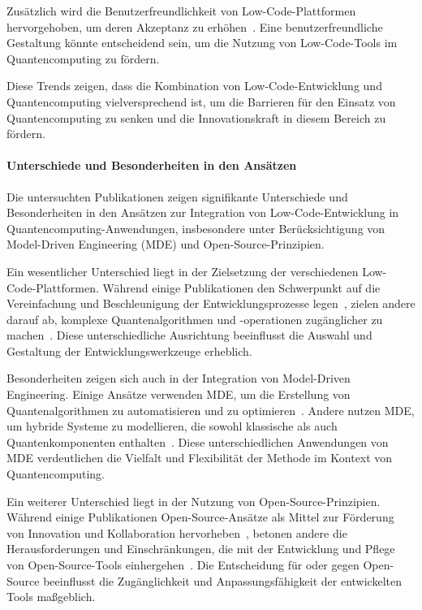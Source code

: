 Zusätzlich wird die Benutzerfreundlichkeit von Low-Code-Plattformen hervorgehoben, um deren Akzeptanz zu erhöhen~\cite{Pinho_2022, Prinz_2021}. 
Eine benutzerfreundliche Gestaltung könnte entscheidend sein, um die Nutzung von Low-Code-Tools im Quantencomputing zu fördern.

Diese Trends zeigen, dass die Kombination von Low-Code-Entwicklung und Quantencomputing vielversprechend ist, um die 
Barrieren für den Einsatz von Quantencomputing zu senken und die Innovationskraft in diesem Bereich zu fördern.

\paragraph{Unterschiede und Besonderheiten in den Ansätzen}

Die untersuchten Publikationen zeigen signifikante Unterschiede und Besonderheiten in den Ansätzen 
zur Integration von Low-Code-Entwicklung in Quantencomputing-Anwendungen, insbesondere unter Berücksichtigung 
von Model-Driven Engineering (MDE) und Open-Source-Prinzipien.

Ein wesentlicher Unterschied liegt in der Zielsetzung der verschiedenen Low-Code-Plattformen. 
Während einige Publikationen den Schwerpunkt auf die Vereinfachung und Beschleunigung der 
Entwicklungsprozesse legen~\cite{Sahay_2020, Khorram_2020}, zielen andere darauf ab, komplexe 
Quantenalgorithmen und -operationen zugänglicher zu machen~\cite{Gemeinhardt_2021, Gemeinhardt_2023}. 
Diese unterschiedliche Ausrichtung beeinflusst die Auswahl und Gestaltung der Entwicklungswerkzeuge erheblich.

Besonderheiten zeigen sich auch in der Integration von Model-Driven Engineering. Einige Ansätze 
verwenden MDE, um die Erstellung von Quantenalgorithmen zu automatisieren und zu optimieren~\cite{Moin_2021, Perez-Castillo_2022}. 
Andere nutzen MDE, um hybride Systeme zu modellieren, die sowohl klassische als auch Quantenkomponenten 
enthalten~\cite{Weder_2020, Polat_2024}. Diese unterschiedlichen Anwendungen von MDE verdeutlichen die Vielfalt 
und Flexibilität der Methode im Kontext von Quantencomputing.

Ein weiterer Unterschied liegt in der Nutzung von Open-Source-Prinzipien. Während einige Publikationen Open-Source-Ansätze 
als Mittel zur Förderung von Innovation und Kollaboration hervorheben~\cite{Amato_2023, Ahmad_2023}, betonen andere die 
Herausforderungen und Einschränkungen, die mit der Entwicklung und Pflege von Open-Source-Tools einhergehen~\cite{Sanchez_2021}. 
Die Entscheidung für oder gegen Open-Source beeinflusst die Zugänglichkeit und Anpassungsfähigkeit der entwickelten Tools maßgeblich.

